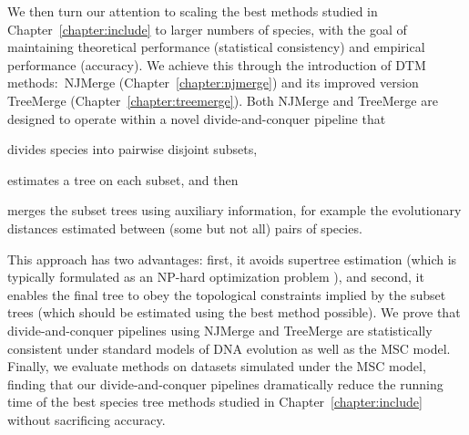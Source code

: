We then turn our attention to scaling the best methods studied in Chapter~\ref{chapter:include} to larger numbers of species, with the goal of maintaining theoretical performance (statistical consistency) and empirical performance (accuracy).
We achieve this through the introduction of \gls{DTM} methods:~\gls{NJMerge} (Chapter~\ref{chapter:njmerge}) and its improved version \gls{TreeMerge} (Chapter~\ref{chapter:treemerge}).
Both NJMerge and TreeMerge are designed to operate within a novel divide-and-conquer pipeline that 
\begin{enumerate*}[label=(\roman*)]
	\item divides species into pairwise disjoint subsets, 
	\item estimates a tree on each subset, and then
	\item merges the subset trees using auxiliary information, for example the evolutionary distances estimated between (some but not all)  pairs of species.
 \end{enumerate*}
This approach has two advantages: first, it avoids supertree estimation (which is typically formulated as an NP-hard optimization problem \cite{bininda2004phylogenetic, warnow2018supertree}), and second, it enables the final tree to obey the topological constraints implied by the subset trees (which should be estimated using the best method possible).
We prove that divide-and-conquer pipelines using NJMerge and TreeMerge are statistically consistent under standard models of DNA evolution as well as the MSC model.
Finally, we evaluate methods on datasets simulated under the MSC model, finding that our divide-and-conquer pipelines dramatically reduce the running time of the best species tree methods studied in Chapter~\ref{chapter:include} without sacrificing accuracy.

